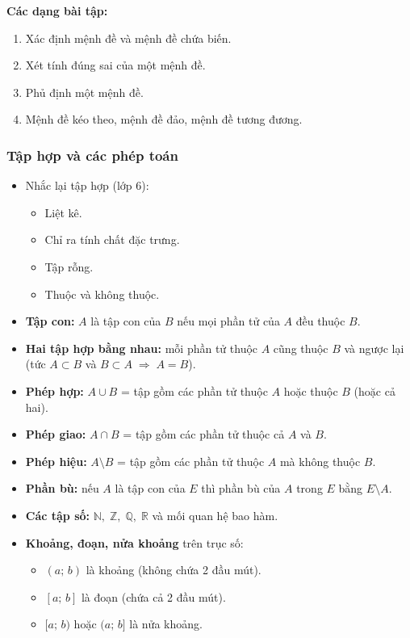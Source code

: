 \documentclass[12pt,a4paper]{article}
\begin{document}
\medskip\noindent\textbf{Các dạng bài tập:}
\begin{enumerate}[label=\textbf{Dạng \arabic*:}, leftmargin=*, align=left]
  \item Xác định mệnh đề và mệnh đề chứa biến.
  \item Xét tính đúng sai của một mệnh đề.
  \item Phủ định một mệnh đề.
  \item Mệnh đề kéo theo, mệnh đề đảo, mệnh đề tương đương.
\end{enumerate}

\subsubsection{Tập hợp và các phép toán}

\begin{dinhnghia}
  \begin{itemize}
    \item Nhắc lại tập hợp (lớp 6):
      \begin{itemize}
        \item Liệt kê.
        \item Chỉ ra tính chất đặc trưng.
        \item Tập rỗng.
        \item Thuộc và không thuộc.
      \end{itemize}
    \item \textbf{Tập con:} $A$ là tập con của $B$ nếu mọi phần tử của $A$ đều thuộc $B$.
    \item \textbf{Hai tập hợp bằng nhau:} mỗi phần tử thuộc $A$ cũng thuộc $B$ và ngược lại (tức $A \subset B$ và $B \subset A \;\Rightarrow\; A = B$).
    \item \textbf{Phép hợp:} $A \cup B$ = tập gồm các phần tử thuộc $A$ hoặc thuộc $B$ (hoặc cả hai).
    \item \textbf{Phép giao:} $A \cap B$ = tập gồm các phần tử thuộc cả $A$ và $B$.
    \item \textbf{Phép hiệu:} $A \setminus B$ = tập gồm các phần tử thuộc $A$ mà không thuộc $B$.
    \item \textbf{Phần bù:} nếu $A$ là tập con của $E$ thì phần bù của $A$ trong $E$ bằng $E \setminus A$.
    \item \textbf{Các tập số:} $\mathbb{N},\; \mathbb{Z},\; \mathbb{Q},\; \mathbb{R}$ và mối quan hệ bao hàm.
    \item \textbf{Khoảng, đoạn, nửa khoảng} trên trục số:
      \begin{itemize}
        \item $(a;\, b)$ là khoảng (không chứa 2 đầu mút).
        \item $[a;\, b]$ là đoạn (chứa cả 2 đầu mút).
        \item $[a;\, b)$ hoặc $(a;\, b]$ là nửa khoảng.
      \end{itemize}
  \end{itemize}
\end{dinhnghia}
\end{document}
